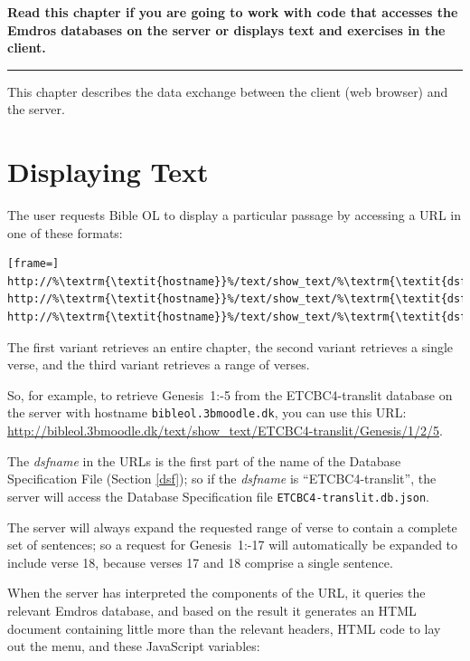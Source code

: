 \documentclass[11pt,oneside,a4paper]{memoir}
\newcommand*{\bibleref}[3]{#1~#2\thinspace:\thinspace#3}
\begin{document}
\textbf{Read this chapter if you are going to work with code that accesses the Emdros databases on
  the server or displays text and exercises in the client.}
\plainbreak{3}

This chapter describes the data exchange between the client (web browser) and the server.

\section{Displaying Text}\label{displaying-text}

The user requests Bible OL to display a particular passage by accessing a URL in one of these formats:

\begin{lstlisting}[frame=]
http://%\textrm{\textit{hostname}}%/text/show_text/%\textrm{\textit{dsfname}}%/%\textrm{\textit{book}}%/%\textrm{\textit{chapter}}%
http://%\textrm{\textit{hostname}}%/text/show_text/%\textrm{\textit{dsfname}}%/%\textrm{\textit{book}}%/%\textrm{\textit{chapter}}%/%\textrm{\textit{verse}}%
http://%\textrm{\textit{hostname}}%/text/show_text/%\textrm{\textit{dsfname}}%/%\textrm{\textit{book}}%/%\textrm{\textit{chapter}}%/%\textrm{\textit{firstverse}}%/%\textrm{\textit{lastverse}}%
\end{lstlisting}

The first variant retrieves an entire chapter, the second variant retrieves a single verse, and the
third variant retrieves a range of verses.

So, for example, to retrieve \bibleref{Genesis}{1}{2-5} from the ETCBC4-translit database on the
server with hostname \texttt{bibleol.3bmoodle.dk}, you can use this URL:
\url{http://bibleol.3bmoodle.dk/text/show_text/ETCBC4-translit/Genesis/1/2/5}.

The \emph{dsfname} in the URLs is the first part of the name of the Database Specification File
(Section \ref{dsf}); so if the \emph{dsfname} is ``ETCBC4-translit'', the server will access the
Database Specification file \texttt{ETCBC4-translit.db.json}.

The server will always expand the requested range of verse to contain a complete set of sentences;
so a request for \bibleref{Genesis}{1}{16-17} will automatically be expanded to include verse 18,
because verses 17 and 18 comprise a single sentence.

When the server has interpreted the components of the URL, it queries the relevant Emdros database,
and based on the result it generates an HTML document containing little more than the relevant
headers, HTML code to lay out the menu, and these JavaScript variables:
\end{document}
